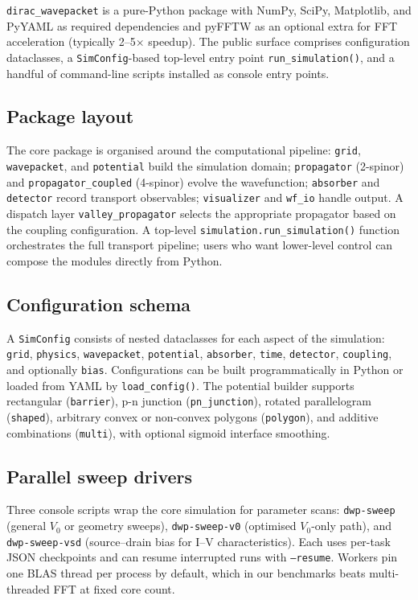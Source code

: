 \documentclass[preprint, 11pt]{elsarticle}
\newcommand{\dirac}{\texttt{dirac\_wavepacket}\xspace}
\begin{document}
\dirac is a pure-Python package with NumPy, SciPy, Matplotlib, and
PyYAML as required dependencies and pyFFTW as an optional extra for
FFT acceleration (typically 2--5$\times$ speedup). The public surface
comprises configuration dataclasses, a \texttt{SimConfig}-based
top-level entry point \texttt{run\_simulation()}, and a handful of
command-line scripts installed as console entry points.

\subsection{Package layout}
The core package is organised around the computational pipeline:
\texttt{grid}, \texttt{wavepacket}, and \texttt{potential} build the
simulation domain; \texttt{propagator} (2-spinor) and
\texttt{propagator\_coupled} (4-spinor) evolve the wavefunction;
\texttt{absorber} and \texttt{detector} record transport observables;
\texttt{visualizer} and \texttt{wf\_io} handle output. A dispatch
layer \texttt{valley\_propagator} selects the appropriate propagator
based on the coupling configuration. A top-level
\texttt{simulation.run\_simulation()} function orchestrates the
full transport pipeline; users who want lower-level control can
compose the modules directly from Python.

\subsection{Configuration schema}
A \texttt{SimConfig} consists of nested dataclasses for each aspect
of the simulation: \texttt{grid}, \texttt{physics}, \texttt{wavepacket},
\texttt{potential}, \texttt{absorber}, \texttt{time},
\texttt{detector}, \texttt{coupling}, and optionally \texttt{bias}.
Configurations can be built programmatically in Python or loaded from
YAML by \texttt{load\_config()}. The potential builder supports
rectangular (\texttt{barrier}), p-n junction (\texttt{pn\_junction}),
rotated parallelogram (\texttt{shaped}), arbitrary convex or
non-convex polygons (\texttt{polygon}), and additive combinations
(\texttt{multi}), with optional sigmoid interface smoothing.

\subsection{Parallel sweep drivers}
Three console scripts wrap the core simulation for parameter scans:
\texttt{dwp-sweep} (general $V_0$ or geometry sweeps),
\texttt{dwp-sweep-v0} (optimised $V_0$-only path), and
\texttt{dwp-sweep-vsd} (source--drain bias for I--V
characteristics). Each uses per-task JSON checkpoints and can resume
interrupted runs with \texttt{--resume}. Workers pin one BLAS thread
per process by default, which in our benchmarks beats multi-threaded
FFT at fixed core count.
\end{document}
